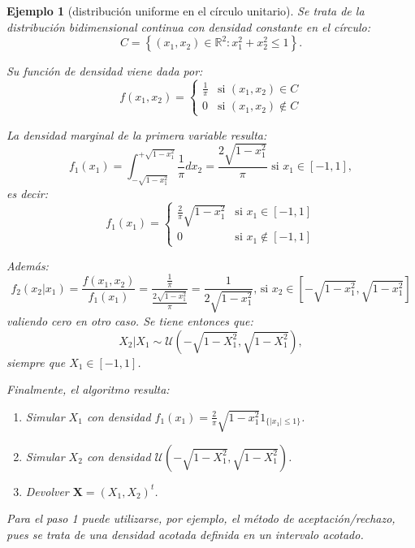 \documentclass[
]{book}
\theoremstyle{break}
\newtheorem{example}{Ejemplo}[chapter]
\theoremstyle{nonumberplain}
\begin{document}
\begin{example}[distribución uniforme en el círculo unitario]

Se trata de la distribución bidimensional continua con densidad
constante en el círculo:
\[C = \left\{ \left( x_1, x_2 \right)  \in \mathbb{R}^2 : x_1^2 + x_2^2 \leq 1 \right\}.\]

Su función de densidad viene dada por:
\[f\left( x_1,x_2\right)  =\left\{
\begin{array}{ll}
\frac{1}{\pi} & \text{si } \left( x_1,x_2\right)  \in C\\
0 & \text{si } \left( x_1,x_2\right)  \notin C
\end{array}\right.\]

La densidad marginal de la primera variable resulta:
\[f_1\left( x_1\right)  =\int_{-\sqrt{1-x_1^2}}^{+\sqrt{1-x_1^2}}\frac{1}{\pi}dx_2
=\frac{2\sqrt{1-x_1^2}}{\pi}
\text{ si }x_1\in\left[-1,1\right],\]
es decir:
\[f_1\left( x_1\right)  =\left\{
\begin{array}{ll}
\frac{2}{\pi}\sqrt{1-x_1^2} & \text{si } x_1\in\left[  -1,1\right]  \\
0 & \text{si } x_1\notin\left[ -1,1\right]  
\end{array}\right.\]

Además:
\[f_2\left( x_2|x_1\right) = \frac{f\left( x_1,x_2\right)  }{f_1\left( x_1\right)} = \frac{\frac{1}{\pi}}{\frac{2\sqrt{1-x_1^2}}{\pi}}=\frac{1}{2\sqrt{1-x_1^2}}\text{, si }x_2\in\left[
-\sqrt{1-x_1^2},\sqrt{1-x_1^2}\right]\]
valiendo cero en otro caso.
Se tiene entonces que:
\[X_2|X_1 \sim \mathcal{U}\left(  -\sqrt{1-X_1^2},\sqrt{1-X_1^2}\right),\]
siempre que \(X_1\in\left[ -1,1\right]\).

Finalmente, el algoritmo resulta:

\begin{enumerate}
\def\labelenumi{\arabic{enumi}.}
\item
  Simular \(X_1\) con densidad \(f_1\left( x_1\right) =\frac{2}{\pi}\sqrt{1-x_1^2}1_{\{|x_1|\leq1\}}\).
\item
  Simular \(X_2\) con densidad \(\mathcal{U}\left( -\sqrt{1-X_1^2},\sqrt{1-X_1^2}\right)\).
\item
  Devolver \(\mathbf{X}=\left( X_1,X_2\right) ^t\).
\end{enumerate}

Para el paso 1 puede utilizarse, por ejemplo, el método de
aceptación/rechazo, pues se trata de una densidad acotada definida en un
intervalo acotado.
\end{example}
\end{document}
